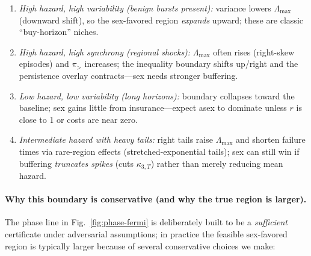 \documentclass[11pt]{article}
\theoremstyle{upright}
\newcommand{\horizon}{\Lambda}
\newcommand{\Lmax}{\horizon^{(T)}_{\max}}
\renewcommand{\Lmax}{\Lambda_{\max}}
\begin{document}
\begin{enumerate}[label=(Q\arabic*)]
\item  \emph{High hazard, high variability (benign bursts present):} variance lowers $\Lmax$ (downward shift), so the sex-favored region \emph{expands} upward; these are classic “buy-horizon” niches.
\item \emph{High hazard, high synchrony (regional shocks):}  $\Lmax$ often rises (right-skew episodes) and $\pi_{>}$ increases; the inequality boundary shifts up/right and the persistence overlay contracts—sex needs stronger buffering.
\item \emph{Low hazard, low variability (long horizons):}  boundary collapses toward the baseline; sex gains little from insurance—expect asex to dominate unless $r$ is close to 1 or costs are near zero.
\item \emph{Intermediate hazard with heavy tails:} right tails raise $\Lmax$ and shorten failure times via rare-region effects (stretched-exponential tails); sex can still win if buffering \emph{truncates spikes} (cuts $\kappa_{3,T}$) rather than merely reducing mean hazard.
\end{enumerate}

\paragraph{Why this boundary is conservative (and why the true region is larger).}
The phase line in Fig.~\ref{fig:phase-fermi} is deliberately built to be a \emph{sufficient} certificate under
adversarial assumptions; in practice the feasible sex-favored region is typically larger because of several conservative
choices we make:
\end{document}

